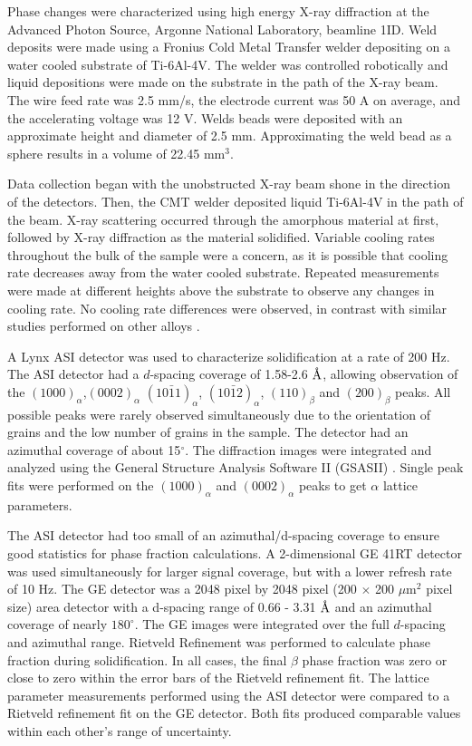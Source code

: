 Phase changes were characterized using high energy X-ray diffraction at the Advanced Photon Source, Argonne National Laboratory, beamline 1ID. Weld deposits were made using a Fronius Cold Metal Transfer welder depositing on a water cooled substrate of Ti-6Al-4V. The welder was controlled robotically and liquid depositions were made on the substrate in the path of the X-ray beam. The wire feed rate was 2.5 mm/s, the electrode current was 50 A on average, and the accelerating voltage was 12 V. Welds beads were deposited with an approximate height and diameter of 2.5 mm. Approximating the weld bead as a sphere results in a volume of 22.45 mm$^3$. 

Data collection began with the unobstructed X-ray beam shone in the direction of the detectors. Then, the CMT welder deposited liquid Ti-6Al-4V in the path of the beam. X-ray scattering occurred through the amorphous material at first, followed by X-ray diffraction as the material solidified. Variable cooling rates throughout the bulk of the sample were a concern, as it is possible that cooling rate decreases away from the water cooled substrate. Repeated measurements were made at different heights above the substrate to observe any changes in cooling rate. No cooling rate differences were observed, in contrast with similar studies performed on other alloys \cite{Brown2019}.

A Lynx ASI detector was used to characterize solidification at a rate of 200 Hz. The ASI detector had a $d$-spacing coverage of 1.58-2.6 $\textup{\AA}$, allowing observation of the $(1000)_\alpha$,$(0002)_\alpha$ $(10\bar{1}1)_\alpha$, $(10\bar{1}2)_\alpha$, $(110)_\beta$ and $(200)_\beta$ peaks. All possible peaks were rarely observed simultaneously due to the orientation of grains and the low number of grains in the sample. The detector had an azimuthal coverage of about 15$^\circ$. The diffraction images were integrated and analyzed using the General Structure Analysis Software II (GSASII) \cite{GSASII}. Single peak fits were performed on the $(1000)_\alpha$ and $(0002)_\alpha$ peaks to get $\alpha$ lattice parameters. 

The ASI detector had too small of an azimuthal/d-spacing coverage to ensure good statistics for phase fraction calculations. A 2-dimensional GE 41RT detector was used simultaneously for larger signal coverage, but with a lower refresh rate of 10 Hz. The GE detector was a 2048 pixel by 2048 pixel (200 $\times$ 200 $\mu$m$^2$ pixel size) area detector with a d-spacing range of 0.66 - 3.31 $\textup{\AA}$ and an azimuthal coverage of nearly $180^\circ$. The GE images were integrated over the full $d$-spacing and azimuthal range. Rietveld Refinement was performed to calculate phase fraction during solidification. In all cases, the final $\beta$ phase fraction was zero or close to zero within the error bars of the Rietveld refinement fit. The lattice parameter measurements performed using the ASI detector were compared to a Rietveld refinement fit on the GE detector. Both fits produced comparable values within each other's range of uncertainty.

